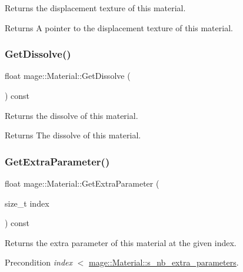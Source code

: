 Returns the displacement texture of this material.

\begin{DoxyReturn}{Returns}
A pointer to the displacement texture of this material. 
\end{DoxyReturn}
\hypertarget{structmage_1_1_material_aa320c6b371b9f055a76821db71d185bc}{}\label{structmage_1_1_material_aa320c6b371b9f055a76821db71d185bc} 
\subsubsection{\texorpdfstring{Get\+Dissolve()}{GetDissolve()}}
{\footnotesize\ttfamily float mage\+::\+Material\+::\+Get\+Dissolve (\begin{DoxyParamCaption}{ }\end{DoxyParamCaption}) const\hspace{0.3cm}{\ttfamily [noexcept]}}

Returns the dissolve of this material.

\begin{DoxyReturn}{Returns}
The dissolve of this material. 
\end{DoxyReturn}
\hypertarget{structmage_1_1_material_a1efbefd3f56a7ea01a2a3bfef261f3c0}{}\label{structmage_1_1_material_a1efbefd3f56a7ea01a2a3bfef261f3c0} 
\subsubsection{\texorpdfstring{Get\+Extra\+Parameter()}{GetExtraParameter()}}
{\footnotesize\ttfamily float mage\+::\+Material\+::\+Get\+Extra\+Parameter (\begin{DoxyParamCaption}\item[{size\+\_\+t}]{index }\end{DoxyParamCaption}) const\hspace{0.3cm}{\ttfamily [noexcept]}}

Returns the extra parameter of this material at the given index.

\begin{DoxyPrecond}{Precondition}
{\itshape index} {\ttfamily $<$} \hyperlink{structmage_1_1_material_ab8d10c2cb8ab77bee18654e63acaa63a}{mage\+::\+Material\+::s\+\_\+nb\+\_\+extra\+\_\+parameters}. 
\end{DoxyPrecond}

